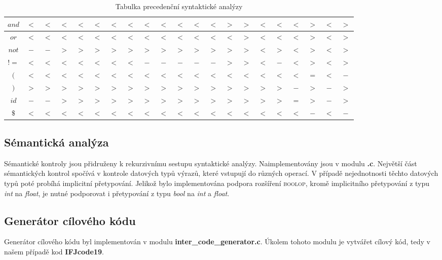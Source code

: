 \documentclass[12pt]{article}
\begin{document}
\begin{table}[!htbp]
\begin{tabular}{|c|c|c|c|c|c|c|c|c|c|c|c|c|c|c|c|c|c|c|c|c|}
    \hline
        $and$ & $<$ & $<$ & $<$ & $<$ & $<$ & $<$ & $<$ & $<$ & $<$ & $<$ & $<$ & $<$ & $>$ & $>$ & $<$ & $<$ & $<$ & $>$ & $<$ & $>$\\
    \hline
        $or$ & $<$ & $<$ & $<$ & $<$ & $<$ & $<$ & $<$ & $<$ & $<$ & $<$ & $<$ & $<$ & $<$ & $>$ & $<$ & $<$ & $<$ & $>$ & $<$ & $>$\\
    \hline
        $not$ & $-$ & $-$ & $>$ & $>$ & $>$ & $>$ & $>$ & $>$ & $>$ & $>$ & $>$ & $>$ & $>$ & $>$ & $<$ & $>$ & $<$ & $>$ & $<$ & $>$\\
    \hline
        $!=$ & $<$ & $<$ & $<$ & $<$ & $<$ & $<$ & $<$ & $-$ & $-$ & $-$ & $-$ & $-$ & $>$ & $>$ & $<$ & $-$ & $<$ & $>$ & $<$ & $>$\\
    \hline
        $($ & $<$ & $<$ & $<$ & $<$ & $<$ & $<$ & $<$ & $<$ & $<$ & $<$ & $<$ & $<$ & $<$ & $<$ & $<$ & $<$ & $<$ & $=$ & $<$ & $-$\\
    \hline
        $)$ & $>$ & $>$ & $>$ & $>$ & $>$ & $>$ & $>$ & $>$ & $>$ & $>$ & $>$ & $>$ & $>$ & $>$ & $>$ & $>$ & $-$ & $>$ & $-$ & $>$\\
    \hline
        $id$ & $-$ & $-$ & $>$ & $>$ & $>$ & $>$ & $>$ & $>$ & $>$ & $>$ & $>$ & $>$ & $>$ & $>$ & $>$ & $>$ & $=$ & $>$ & $-$ & $>$\\
    \hline
        $\$$ & $<$ & $<$ & $<$ & $<$ & $<$ & $<$ & $<$ & $<$ & $<$ & $<$ & $<$ & $<$ & $<$ & $<$ & $<$ & $<$ & $<$ & $-$ & $<$ & $-$\\
    \hline
    \end{tabular}
    \caption{Tabulka precedenční syntaktické analýzy}
    \label{tab:3}
\end{table}

\subsection{Sémantická analýza}
Sémantické kontroly jsou přidruženy k rekurzivnímu sestupu syntaktické analýzy.
Naimplementovány jsou v modulu \textbf{.c}. Největší část sémantických kontrol spočívá v kontrole datových typů výrazů, které vstupují do různých operací. V případě nejednotnosti těchto datových typů poté probíhá implicitní přetypování. Jelikož bylo implementována podpora rozšíření \textsc{boolop}, kromě implicitního přetypování z typu \emph{int} na \emph{float}, je nutné podporovat i přetypování z typu \emph{bool} na \emph{int} a \emph{float}.

\subsection{Generátor cílového kódu}
Generátor cílového kódu byl implementován v modulu \textbf{inter\_code\_generator.c}. Úkolem tohoto modulu je vytvářet cílový kód, tedy v našem případě kod \textbf{IFJcode19}.
\end{document}
